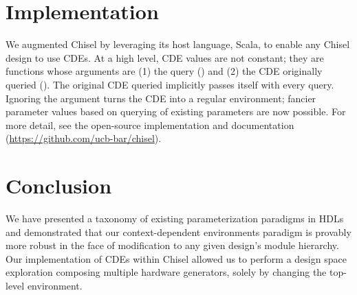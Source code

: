 \section{Implementation}
\label{sec:dse}

We augmented Chisel by leveraging its host language, Scala, to enable any Chisel design to use CDEs. At a high level, CDE values are not constant; they are functions whose arguments are (1) the query () and (2) the CDE originally queried (). The original CDE queried implicitly passes itself with every query. Ignoring the  argument turns the CDE into a regular environment; fancier parameter values based on querying  of existing parameters are now possible. For more detail, see the open-source implementation and documentation (\url{https://github.com/ucb-bar/chisel}).


\section{Conclusion}
\label{sec:con}

We have presented a taxonomy of existing parameterization paradigms in HDLs and demonstrated that our context-dependent environments paradigm is provably more robust in the face of modification to any given design's module hierarchy. Our implementation of CDEs within Chisel allowed us to perform a design space exploration composing multiple hardware generators, solely by changing the top-level environment.

